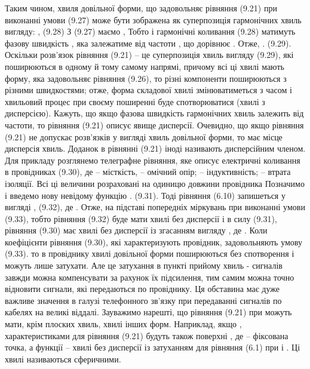 Таким чином, хвиля довільної форми, що задовольняє рівняння (9.21) при виконанні умови (9.27) може бути зображена як суперпозиція гармонічних хвиль вигляду:  ,                             (9.28) 
З (9.27) маємо               ,
Тобто   і гармонічні коливання (9.28) матимуть фазову швидкість  , яка залежатиме від частоти  , що дорівнює     .
Отже,  .                        (9.29).
Оскільки розв’язок рівняння (9.21) – це суперпозиція хвиль вигляду (9.29), які поширюються в одному й тому самому напрямі, причому всі ці хвилі мають форму, яка задовольняє рівняння (9.26), то різні компоненти поширюються з різними швидкостями; отже, форма складової хвилі   змінюватиметься з часом   і хвильовий процес при своєму поширенні буде спотворюватися (хвилі з дисперсією). Кажуть, що якщо фазова швидкість гармонічних хвиль залежить від частоти, то рівняння (9.21) описує явище дисперсії.
Очевидно, що якщо рівняння (9.21) не допускає розв’язків у вигляді хвиль довільної форми, то має місце дисперсія хвиль. Доданок   в рівнянні (9.21) іноді називають дисперсійним членом.
Для прикладу розглянемо телеграфне рівняння, яке описує електричні коливання в провідниках
            (9.30),
де   – місткість,   – омічний опір;   – індуктивність;   – втрата ізоляції. Всі ці величини розраховані на одиницю довжини провідника Позначимо   і введемо нову невідому функцію
 .                              (9.31).
Тоді рівняння (6.10) запишеться у вигляді
 ,                      (9.32),
де   .
Отже, на підставі попередніх міркувань при виконанні умови 
                                     (9.33), тобто   рівняння (9.32) буде мати хвилі без дисперсії і в силу (9.31), рівняння (9.30) має хвилі без дисперсії із згасанням вигляду
 , де  .
Коли коефіцієнти рівняння (9.30), які характеризують провідник, задовольняють умову (9.33). то в провіднику хвилі довільної форми поширюються без спотворення і можуть лише затухати. Але це затухання в пункті прийому хвиль - сигналів завжди можна компенсувати за рахунок їх підсилення, тим самим можна точно відновити сигнали, які передаються по провіднику.
Ця обставина має дуже важливе значення в галузі телефонного зв’язку при передаванні сигналів по кабелях на великі віддалі.
Зауважимо нарешті, що рівняння (9.21) при   можуть мати, крім плоских хвиль, хвилі інших форм. Наприклад, якщо  , характеристиками для рівняння (9.21) будуть також поверхні
 , де   – фіксована точка, а функції   – хвилі без дисперсії із затуханням для рівняння (6.1) при   і  . Ці хвилі називаються сферичними.



